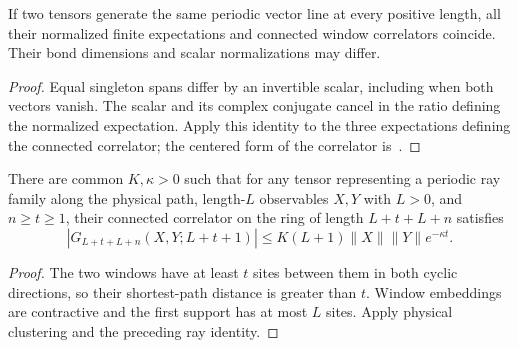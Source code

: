 \begin{lemma}
    \label{lem:spt_positive_ray_expectations}
    \leanok
    If two tensors generate the same periodic vector line at every
    positive length, all their normalized finite expectations and
    connected window correlators coincide. Their bond dimensions and
    scalar normalizations may differ.
\end{lemma}
\begin{proof}\leanok
    Equal singleton spans differ by an invertible scalar, including when
    both vectors vanish. The scalar and its complex conjugate cancel in
    the ratio defining the normalized expectation. Apply this identity
    to the three expectations defining the connected correlator; the centered form of the
    correlator is~\cite[``Centering an observable at an unnormalized
        vector'']{QICLean2026Blueprint}.
\end{proof}

\begin{lemma}
    \label{cor:spt_physical_window_clustering}
    \leanok
    There are common $K,\kappa>0$ such that for any tensor representing
    a periodic ray family along the physical path, length-$L$ observables
    $X,Y$ with $L>0$, and $n\ge t\ge1$, their connected correlator on
    the ring of length $L+t+L+n$ satisfies
    \[
        |G_{L+t+L+n}(X,Y;L+t+1)|
        \le K(L+1)\|X\|\|Y\|e^{-\kappa t}.
    \]
\end{lemma}
\begin{proof}\leanok
    The two windows have at least $t$ sites between them in both cyclic
    directions, so their shortest-path distance is greater than $t$.
    Window embeddings are contractive and the first support has at most
    $L$ sites. Apply physical clustering and the preceding ray identity.
\end{proof}

